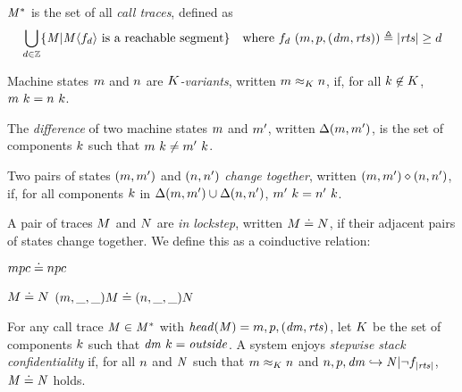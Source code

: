 \documentclass[acmsmall,review,anonymous]{acmart}\settopmatter{printfolios=true,printccs=false,printacmref=false}
\begin{document}
 \(\mathit{M}^*\) is the set of all \emph{call traces}, defined as
\[\begin{aligned}
\bigcup_{d \in \mathbb{Z}} \{\mathit{M} | \mathit{M}\langle f_d \rangle
\text{ is a reachable segment}\} \hspace{1em} &
\text{where } f_d ~ (m,p,(\mathit{dm},\mathit{rts})) \triangleq |\mathit{rts}| \geq d \\
\end{aligned}\]

 Machine states \(m\) and \(n\) are {\em \(K\)-variants},
written \(m \approx_K n\), if, for
all \(k \not \in K\), \(m ~ k = n ~ k\).

 The \emph{difference} of two machine states \(m\) and \(m'\), written \(\Delta(m,m')\),
is the set of components \(k\)
such that \(m ~ k \not = m' ~ k\).

 Two pairs of states \((m,m')\) and \((n,n')\)
 {\em change together}, written \((m,m') \diamond (n,n')\), if, for all components \(k\) in
\(\Delta(m,m') \cup \Delta(n,n')\),
\(m' ~ k = n' ~ k\).

 A pair of traces \(M\) and \(N\) are {\em in lockstep},
written \(M \doteq N\),
if their adjacent pairs of states change together.  We define this as a coinductive relation:

\begin{minipage}{.3\textwidth}
\judgment{}
         {\(mpc \doteq npc\)}
\end{minipage}
\begin{minipage}{.6\textwidth}
\judgmenttwo{\(\mach, \pi_\mach(\head(\machT)) \diamond \nach, \pi_\mach(\head(\nachT))\)}
            {\(M \doteq N\)}
            {\((m,\_,\_) M \doteq (n,\_,\_) N\)}
\end{minipage}

For any call trace \(\mathit{M} \in \mathit{M}^*\) with \(\mathit{head}(\mathit{M}) = m,p,(\mathit{dm},\mathit{rts})\),
let \(K\) be the set of components \(k\) such that
\(\mathit{dm} ~ k = \mathit{outside}\).
A system enjoys \emph{stepwise stack confidentiality} if,
for all \(n\) and \(\mathit{N}\) such that \(m \approx_K n\)
and \(n,p,\mathit{dm} \hookrightarrow \mathit{N} | \neg f_{|\mathit{rts}|}\),
\(\mathit{M} \doteq \mathit{N}\) holds.
\end{document}

